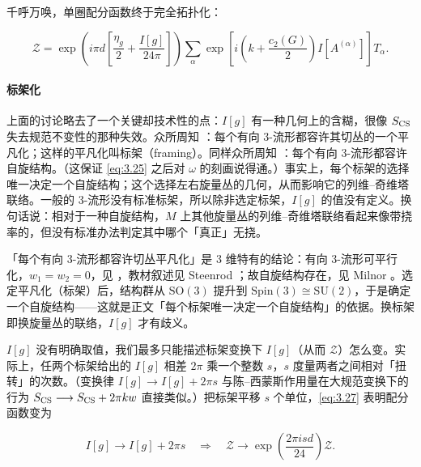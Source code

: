 千呼万唤，单圈配分函数终于完全拓扑化：

\begin{equation}\tag{3.27}\label{eq:3.27}
  \mathcal{Z} = \exp\left(i\pi d\left[\frac{\eta_g}{2}+\frac{I[g]}{24\pi}\right]\right)
  \sum_{\alpha}\exp\left[i\left(k+\frac{c_2(G)}{2}\right)I[A^{(\alpha)}]\right]T_\alpha .
\end{equation}

\paragraph{标架化} 上面的讨论略去了一个关键却技术性的点：$I[g]$ 有一种几何上的含糊，很像 $S_{\mathrm{CS}}$ 失去规范不变性的那种失效。众所周知 \cite{parker1984}：每个有向 3-流形都容许其切丛的一个平凡化；这样的平凡化叫标架（framing）。同样众所周知 \cite{milnor1974}：每个有向 3-流形都容许自旋结构。（这保证 \eqref{eq:3.25} 之后对 $\omega$ 的刻画说得通。）事实上，每个标架的选择唯一决定一个自旋结构；这个选择左右旋量丛的几何，从而影响它的列维–奇维塔联络。一般的 3-流形没有标准标架，所以除非选定标架，$I[g]$ 的值没有定义。换句话说：相对于一种自旋结构，$M$ 上其他旋量丛的列维–奇维塔联络看起来像带挠率的，但没有标准办法判定其中哪个「真正」无挠。

\begin{yizhu}[含糊点]
「每个有向 3-流形都容许切丛平凡化」是 3 维特有的结论：有向 3-流形可平行化，$w_1=w_2=0$，见 \cite{parker1984}，教材叙述见 Steenrod \cite{steenrod1951}；故自旋结构存在，见 Milnor \cite{milnor1974}。选定平凡化（标架）后，结构群从 $\mathrm{SO}(3)$ 提升到 $\mathrm{Spin}(3)\cong\mathrm{SU}(2)$，于是确定一个自旋结构——这就是正文「每个标架唯一决定一个自旋结构」的依据。换标架即换旋量丛的联络，$I[g]$ 才有歧义。
\end{yizhu}

$I[g]$ 没有明确取值，我们最多只能描述标架变换下 $I[g]$（从而 $\mathcal{Z}$）怎么变。实际上，任两个标架给出的 $I[g]$ 相差 $2\pi$ 乘一个整数 $s$，$s$ 度量两者之间相对「扭转」的次数。（变换律 $I[g]\longrightarrow I[g]+2\pi s$ 与陈--西蒙斯作用量在大规范变换下的行为 $S_{\mathrm{CS}}\longrightarrow S_{\mathrm{CS}}+2\pi kw$ 直接类似。）把标架平移 $s$ 个单位，\eqref{eq:3.27} 表明配分函数变为

\begin{equation}\tag{3.28}\label{eq:3.28}
  I[g]\longrightarrow I[g]+2\pi s
  \quad\Longrightarrow\quad
  \mathcal{Z}\longrightarrow\exp\left(\frac{2\pi isd}{24}\right)\mathcal{Z}.
\end{equation}

